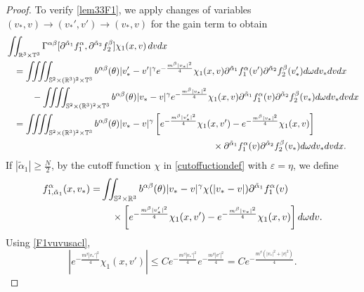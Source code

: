\documentclass[reqno]{amsart}
\numberwithin{equation}{section}
\numberwithin{equation}{section}
\begin{document}
		\begin{proof}
			To verify \eqref{lem33F1}, we apply changes of variables $(v_*, v) \to (v_*', v') \to (v_*, v)$ for the gain term to obtain
			\begin{align}
			&\iint_{\mathbb{R}^3\times\mathbb{T}^3} \Gamma^{\alpha \beta} [\partial^{\tilde{\alpha}_1}f^{\alpha}_1, \partial^{\tilde{\alpha}_2}f^{\beta}_2] \chi_1(x, v) \, dvdx\notag\\
			&\hspace{0.3cm}= \iiiint_{\mathbb{S}^2\times(\mathbb{R}^3)^2\times\mathbb{T}^3} b^{\alpha \beta}(\theta)|v_*' - v'|^\gamma e^{-\frac{m^{\beta}|v_*|^2}{4}} \chi_1(x, v) \partial^{\tilde{\alpha}_1}f^{\alpha}_1(v') \partial^{\tilde{\alpha}_2}f^{\beta}_2(v_*') d \omega dv_* dv dx\notag\\
			&\hspace{1cm}- \iiiint_{\mathbb{S}^2\times(\mathbb{R}^3)^2\times\mathbb{T}^3} b^{\alpha \beta}(\theta)|v_* - v|^\gamma e^{-\frac{m^{\beta}|v_*|^2}{4}} \chi_1(x, v) \partial^{\tilde{\alpha}_1}f^{\alpha}_1(v) \partial^{\tilde{\alpha}_2}f^{\beta}_2(v_*)d \omega dv_* dv dx\notag\\
			&\hspace{0.3cm}= \iiiint_{\mathbb{S}^2\times(\mathbb{R}^3)^2\times\mathbb{T}^3} b^{\alpha \beta}(\theta)|v_* - v|^\gamma \left[ e^{-\frac{m^{\beta}|v_*'|^2}{4}} \chi_1(x, v') - e^{-\frac{m^{\beta}|v_*|^2}{4}} \chi_1(x, v) \right]\label{Socal312ORI}\\
			& \hspace{8cm}\times\partial^{\tilde{\alpha}_1}f^{\alpha}_1(v) \partial^{\tilde{\alpha}_2}f^{\beta}_2(v_*)d \omega dv_* dv dx. \notag
			\end{align}
			If $\left|\tilde{\alpha}_1 \right| \geq \frac{N}{2}$, by the cutoff function $\chi$ in \eqref{cutoffuctiondef} with $\varepsilon = \eta$, we define
			\begin{align}
			f^{\alpha}_{1,\tilde{\alpha}_1}(x,v_*) =& \iint_{\mathbb{S}^2\times\mathbb{R}^3} b^{\alpha \beta}(\theta)|v_* - v|^\gamma \chi(|v_* - v|) \partial^{\tilde{\alpha}_1}f^{\alpha}_1(v)\label{NefAalph1}\\
			&\hspace{0.4cm}\times \left[ e^{-\frac{m^{\beta}|v_*'|^2}{4}} \chi_1(x, v') - e^{-\frac{m^{\beta}|v_*|^2}{4}} \chi_1(x, v) \right] d\omega dv.\notag
			\end{align}
			Using \eqref{F1vuvusacl},
			\begin{equation*}
				\left| e^{-\frac{m^{\beta}|v_*'|^2}{4}} \chi_1(x, v') \right| \le C e^{-\frac{m^{\beta}|v_*'|^2}{4}}e^{-\frac{m^{\beta}|v'|^2}{4}} = C e^{-\frac{m^{\beta}(|v_*|^2+|v|^2)}{4}}.

\end{equation*}
\end{proof}
\end{document}
